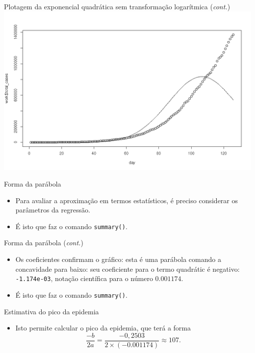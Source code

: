 \documentclass[a4paper,10pt]{beamer}
\begin{document}
\begin{frame}{ Plotagem da exponencial quadrática sem transformação logarítmica
      ({\em cont.})}
  \includegraphics[scale=0.375]{plot-unexp2.png}

\end{frame}

\begin{frame}{ Forma da parábola }
  
  
  \begin{itemize}
      \item Para avaliar a aproximação em termos estatísticos, é preciso 
	  considerar os parâmetros da regressão.
      \item É isto que faz o comando {\tt summary()}.
  \end{itemize}

\end{frame}

\begin{frame}[fragile]{ Forma da parábola ({\em cont.}) }
  
  
  \begin{itemize}
      \item Os coeficientes confirmam o gráfico: esta é uma parábola comando	
	  a concavidade para baixo: seu coeficiente para o termo quadrátic é 
	  negativo: {\tt -1.174e-03}, notação científica para o número
	  $0.001174$.
      \item É isto que faz o comando {\tt summary()}.
  \end{itemize}

\end{frame}

\begin{frame}{ Estimativa do pico da epidemia }
  \begin{itemize}
      \item Isto permite calcular o pico da epidemia, que terá a forma
      \begin{equation*}
       \frac{-b}{2a} = \frac{-0,2503}{2\times(-0.001174)} \approx 107.
      \end{equation*}

  \end{itemize}

\end{frame}
\end{document}
